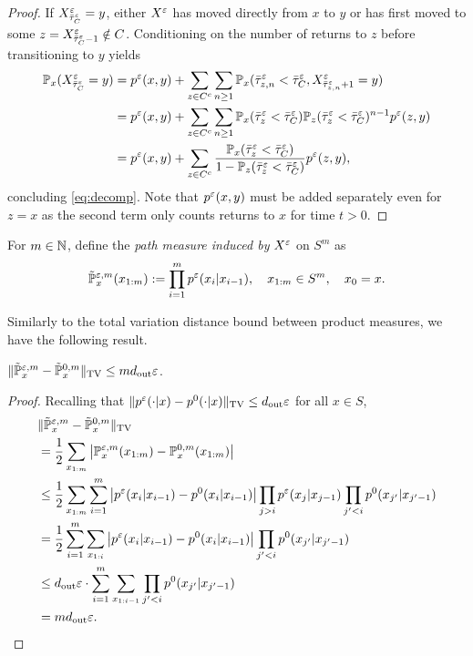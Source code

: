 \begin{proof}
If $X_{\bar{\tau}_C^\varepsilon}^\varepsilon=y$, either $X^\varepsilon$ has moved directly from $x$ to $y$ or has first moved to some $z=X_{\bar{\tau}_C^\varepsilon-1}^\varepsilon\notin C$. Conditioning on the number of returns to $z$ before transitioning to $y$ yields
\begin{align*}
\mathbb{P}_x(X_{\bar{\tau}_C^\varepsilon}^\varepsilon=y)&= p^\varepsilon(x,y) +\sum_{z\in C^c} \sum_{n\ge 1} \mathbb{P}_x(\bar{\tau}_{z,n}^\varepsilon < \bar{\tau}_C^\varepsilon, X_{\bar{\tau}_{z,n}^\varepsilon+1}^\varepsilon =y) \\
&= p^\varepsilon(x,y) +\sum_{z\in C^c} \sum_{n\ge 1} \mathbb{P}_x(\bar{\tau}_z^\varepsilon < \bar{\tau}_C^\varepsilon) \mathbb{P}_z(\bar{\tau}_z^\varepsilon < \bar{\tau}_C^\varepsilon)^{n-1} p^\varepsilon(z,y) \\
&= p^\varepsilon(x,y) +\sum_{z\in C^c} \frac{\mathbb{P}_x(\bar{\tau}_z^\varepsilon < \bar{\tau}_C^\varepsilon)}{1-\mathbb{P}_z(\bar{\tau}_z^\varepsilon < \bar{\tau}_C^\varepsilon)} p^\varepsilon(z,y),
\end{align*}
concluding \eqref{eq:decomp}. Note that $p^\varepsilon(x,y)$ must be added separately even for $z=x$ as the second term only counts returns to $x$ for time $t>0$.
\end{proof}

\begin{defn}
For $m\in\mathbb{N}$, define the \textit{path measure induced by} $X^\varepsilon$ on $S^m$ as
\begin{equation*}
\tilde{\mathbb{P}}_x^{\varepsilon,m}(x_{1:m}) := \prod_{i=1}^m p^\varepsilon(x_i|x_{i-1}), \quad x_{1:m}\in S^m,\quad x_0=x.
\end{equation*}
\end{defn}

Similarly to the total variation distance bound between product measures, we have the following result.
\begin{lemma}\label{thm:pathtv}
$\lVert\tilde{\mathbb{P}}_x^{\varepsilon,m} - \tilde{\mathbb{P}}_x^{0,m}\rVert_{\operatorname{TV}} \le md_{\operatorname{out}}\varepsilon$.
\end{lemma}

\begin{proof}
Recalling that $\lVert p^\varepsilon(\cdot|x) - p^0(\cdot|x)\rVert_{\operatorname{TV}} \le d_{\operatorname{out}}\varepsilon$ for all $x\in S$,
\begin{align*}
&\lVert\tilde{\mathbb{P}}_x^{\varepsilon,m} - \tilde{\mathbb{P}}_x^{0,m}\rVert_{\operatorname{TV}}\\
&= \frac{1}{2} \sum_{x_{1:m}} \left\lvert\mathbb{P}_x^{\varepsilon,m}(x_{1:m}) - \mathbb{P}_x^{0,m}(x_{1:m})\right\rvert \\
&\le \frac{1}{2} \sum_{x_{1:m}} \sum_{i=1}^m \left\lvert p^\varepsilon(x_i|x_{i-1}) - p^0(x_i|x_{i-1})\right\rvert \prod_{j>i} p^\varepsilon(x_j|x_{j-1}) \prod_{j'<i} p^0(x_{j'}|x_{j'-1})\\
&= \frac{1}{2} \sum_{i=1}^m \sum_{x_{1:i}} \left\lvert p^\varepsilon(x_i|x_{i-1}) - p^0(x_i|x_{i-1})\right\rvert \prod_{j'<i} p^0(x_{j'}|x_{j'-1})\\
&\le d_{\operatorname{out}}\varepsilon\cdot \sum_{i=1}^m \sum_{x_{1:i-1}} \prod_{j'<i} p^0(x_{j'}|x_{j'-1})\\
&= md_{\operatorname{out}}\varepsilon.
\end{align*}
\end{proof}

